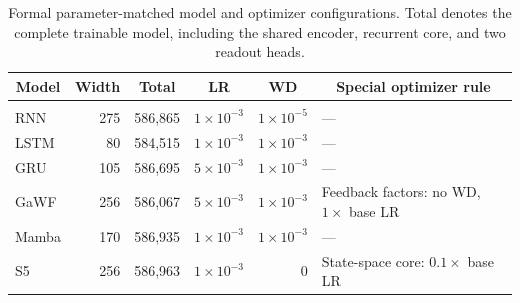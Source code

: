 \begin{table}[t]
\caption{Formal parameter-matched model and optimizer configurations. Total denotes the complete trainable model, including the shared encoder, recurrent core, and two readout heads.}
\label{tab:formal-config}
\begin{center}
\small
\setlength{\tabcolsep}{4.5pt}
\begin{tabular}{lrrrrl}
\multicolumn{1}{c}{\bf Model} &
\multicolumn{1}{c}{\bf Width} &
\multicolumn{1}{c}{\bf Total} &
\multicolumn{1}{c}{\bf LR} &
\multicolumn{1}{c}{\bf WD} &
\multicolumn{1}{c}{\bf Special optimizer rule}
\\ \hline \\
RNN   & 275 & 586,865 & \(1\times10^{-3}\) & \(1\times10^{-5}\) & --- \\
LSTM  & 80  & 584,515 & \(1\times10^{-3}\) & \(1\times10^{-3}\) & --- \\
GRU   & 105 & 586,695 & \(5\times10^{-3}\) & \(1\times10^{-3}\) & --- \\
GaWF  & 256 & 586,067 & \(5\times10^{-3}\) & \(1\times10^{-3}\) & Feedback factors: no WD, \(1\times\) base LR \\
Mamba & 170 & 586,935 & \(1\times10^{-3}\) & \(1\times10^{-3}\) & --- \\
S5    & 256 & 586,963 & \(1\times10^{-3}\) & \(0\)              & State-space core: \(0.1\times\) base LR \\
\end{tabular}
\end{center}
\end{table}
